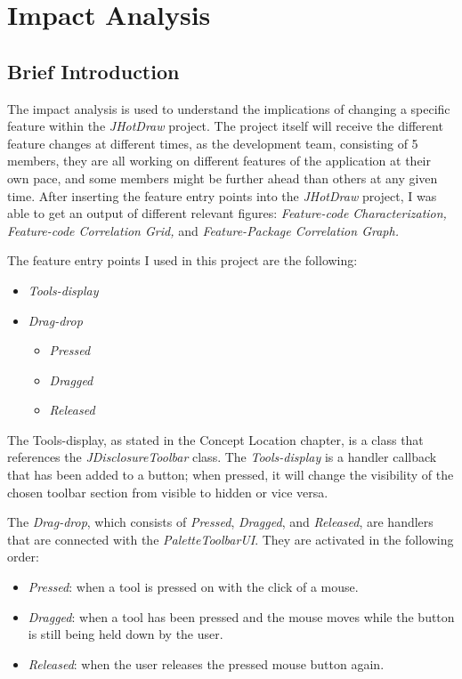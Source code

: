 \section{Impact Analysis}
\subsection{Brief Introduction}
The impact analysis is used to understand the implications of changing a specific feature within the \textit{JHotDraw} project.
The project itself will receive the different feature changes at different times, as the development team, consisting of 5 members,
they are all working on different features of the application at their own pace, and some members might be further ahead than others at any given time.
After inserting the feature entry points into the \textit{JHotDraw} project, I was able to get an output of different relevant figures: \textit{Feature-code Characterization,}
\textit{Feature-code Correlation Grid,} and \textit{Feature-Package Correlation Graph.}

The feature entry points I used in this project are the following:
\begin{itemize}
    \item \textit{Tools-display}
    \item \textit{Drag-drop}
          \begin{itemize}
              \item \textit{Pressed}
              \item \textit{Dragged}
              \item \textit{Released}
          \end{itemize}
\end{itemize}

The \textit{}Tools-display, as stated in the \textit{}Concept Location chapter, is a class that references the \textit{JDisclosureToolbar} class. The \textit{Tools-display} is a handler callback that has been added to a button;
when pressed, it will change the visibility of the chosen toolbar section from visible to hidden or vice versa.

The \textit{Drag-drop}, which consists of \textit{Pressed}, \textit{Dragged}, and \textit{Released}, are handlers that are connected with the \textit{PaletteToolbarUI}. They are activated in the following order:
\begin{itemize}
    \item \textit{Pressed}: when a tool is pressed on with the click of a mouse.
    \item \textit{Dragged}: when a tool has been pressed and the mouse moves while the button is still being held down by the user.
    \item \textit{Released}: when the user releases the pressed mouse button again.
\end{itemize}

